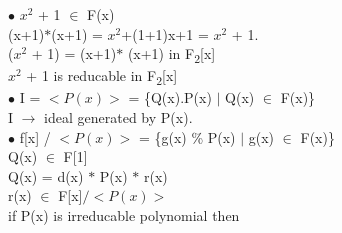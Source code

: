 \documentclass[11pt]{article}
\begin{document}
	$\bullet$ $x^2$ + 1 $\in$ F(x) \\
	(x+1)$\ast$(x+1) = $x^2$+(1+1)x+1 = $x^2$ + 1.\\
	($x^2$ + 1) = (x+1)$\ast$ (x+1) in F\textsubscript{2}[x]\\
	$x^2$ + 1 is reducable in F\textsubscript{2}[x]\vspace{0.3cm}\\
	$\bullet$ I = $<P(x)>$ = \{Q(x).P(x) $|$ Q(x) $\in$ F(x)\} \\
	I $\rightarrow$ ideal generated by P(x).\vspace{0.3cm}\\
	$\bullet$ f[x] / $<P(x)>$ = \{g(x) \% P(x) $|$ g(x) $\in$ F(x)\}\\
	Q(x) $\in$  F[1] \\
	Q(x) = d(x) $\ast$ P(x) $\ast$ r(x) \\
	r(x) $\in$ F[x]$/$$<P(x)>$\\
	if P(x) is irreducable polynomial then
	
\end{document}
